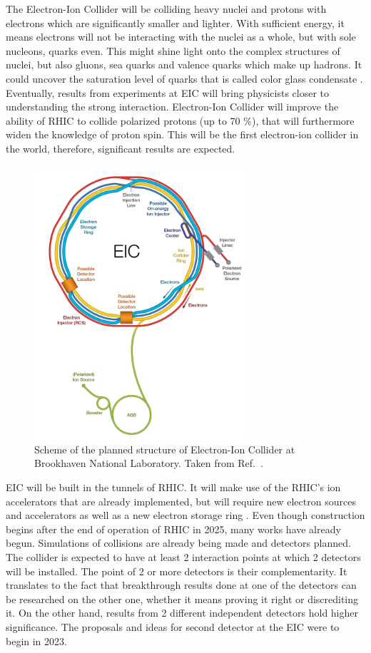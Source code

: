 The Electron-Ion Collider will be colliding heavy nuclei and protons with electrons which are significantly smaller and lighter. With sufficient energy, it means electrons will not be interacting with the nuclei as a whole, but with sole nucleons, quarks even. This might shine light onto the complex structures of nuclei, but also gluons, sea quarks and valence quarks which make up hadrons. It could uncover the saturation level of quarks that is called color glass condensate \cite{EIC}. Eventually, results from experiments at EIC will bring physicists closer to understanding the strong interaction. Electron-Ion Collider will improve the ability of RHIC to collide polarized protons (up to 70 $\%$), that will furthermore widen the knowledge of proton spin. This will be the first electron-ion collider in the world, therefore, significant results are expected. 
\FloatBarrier
\begin{figure}[ht]
    \centering
    \includegraphics[width=0.7\textwidth]{figures/EIC.jpg}
    \caption[Schematic view of the Electron Ion Collider]{Scheme of the planned structure of Electron-Ion Collider at Brookhaven National Laboratory. Taken from Ref.~\cite{flickr}. }
    \label{df2}
\end{figure}
\FloatBarrier
EIC will be built in the tunnels of RHIC. It will make use of the RHIC's ion accelerators that are already implemented, but will require new electron sources and accelerators as well as a new electron storage ring \cite{EIC}. Even though construction begins after the end of operation of RHIC in 2025, many works have already begun. Simulations of collisions are already being made and detectors planned. The collider is expected to have at least 2 interaction points at which 2 detectors will be installed. The point of 2 or more detectors is their complementarity. It translates to the fact that breakthrough results done at one of the detectors can be researched on the other one, whether it means proving it right or discrediting it. On the other hand, results from 2 different independent detectors hold higher significance. The proposals and ideas for second detector at the EIC were to begin in 2023.
